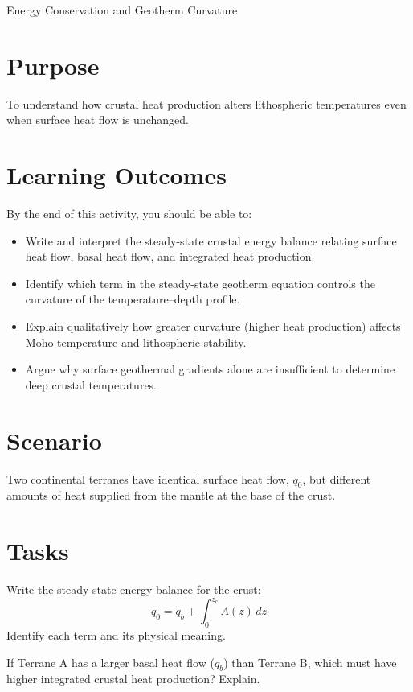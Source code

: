 \begin{activity}{Energy Conservation and Geotherm Curvature}

\section*{Purpose}
To understand how crustal heat production alters lithospheric temperatures even when surface heat flow is unchanged.

{\color{red}
\section*{Learning Outcomes}

By the end of this activity, you should be able to:
\begin{itemize}
  \item Write and interpret the steady-state crustal energy balance relating surface heat flow, basal heat flow, and integrated heat production.
  \item Identify which term in the steady-state geotherm equation controls the curvature of the temperature--depth profile.
  \item Explain qualitatively how greater curvature (higher heat production) affects Moho temperature and lithospheric stability.
  \item Argue why surface geothermal gradients alone are insufficient to determine deep crustal temperatures.
\end{itemize}
}

\section*{Scenario}
Two continental terranes have identical surface heat flow, $q_0$, but different
amounts of heat supplied from the mantle at the base of the crust.

\section*{Tasks}

\begin{questions}
  Write the steady-state energy balance for the crust:
  \[
    q_0 = q_b + \int_0^{z_c} A(z)\,dz
  \]
  Identify each term and its physical meaning.
  \answerbox[3cm]

  \item If Terrane A has a larger basal heat flow ($q_b$) than Terrane B, which must have higher integrated crustal heat production? Explain.
  \answerbox[3cm]


\end{questions}
\end{activity}
